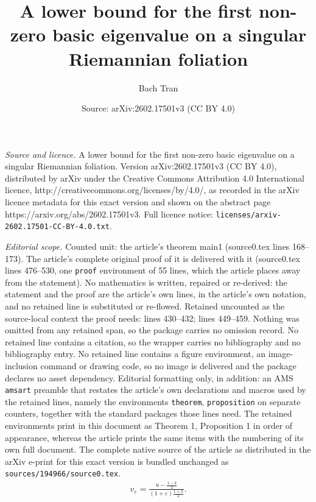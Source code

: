 \documentclass[10pt,a4paper]{amsart}
\title{A lower bound for the first non-zero basic eigenvalue on a singular Riemannian foliation}
\author{Bach Tran}
\date{Source: arXiv:2602.17501v3 (CC BY 4.0)}
\begin{document}
\maketitle

\noindent\emph{Source and licence.} A lower bound for the first non-zero basic eigenvalue on a singular Riemannian foliation. Version arXiv:2602.17501v3 (CC BY 4.0), distributed by arXiv under the Creative Commons Attribution 4.0 International licence, http://creativecommons.org/licenses/by/4.0/, as recorded in the arXiv licence metadata for this exact version and shown on the abstract page https://arxiv.org/abs/2602.17501v3. Full licence notice: \texttt{licenses/arxiv-2602.17501-CC-BY-4.0.txt}.\par\smallskip

\noindent\textit{Editorial scope.} Counted unit: the article's theorem main1 (source0.tex lines 168--173). The article's complete original proof of it is delivered with it (source0.tex lines 476--530, one \texttt{proof} environment of 55 lines, which the article places away from the statement). No mathematics is written, repaired or re-derived: the statement and the proof are the article's own lines, in the article's own notation, and no retained line is substituted or re-flowed.  Retained uncounted as the source-local context the proof needs: lines 430--432; lines 449--459.  Nothing was omitted from any retained span, so the package carries no omission record.  No retained line contains a citation, so the wrapper carries no bibliography and no bibliography entry.  No retained line contains a figure environment, an image-inclusion command or drawing code, so no image is delivered and the package declares no asset dependency.  Editorial formatting only, in addition: an AMS \texttt{amsart} preamble that restates the article's own declarations and macros used by the retained lines, namely the environments \texttt{theorem}, \texttt{proposition} on separate counters, together with the standard packages those lines need.  The retained environments print in this document as Theorem 1, Proposition 1 in order of appearance, whereas the article prints the same items with the numbering of its own full document.  The complete native source of the article as distributed in the arXiv e-print for this exact version is bundled unchanged as \texttt{sources/194966/source0.tex}.
    \begin{align}\label{uia}
        v_{\varepsilon}=\frac{u-\frac{1-k}{2}}{(1+\varepsilon)\frac{1+k}{2}}.
    \end{align}
\end{document}
